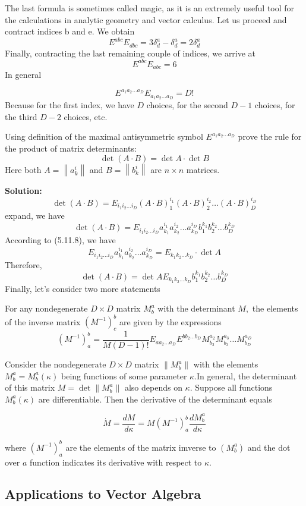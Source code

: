 The last formula is sometimes called magic, as it is an extremely useful tool for the calculations in analytic geometry and vector calculus. Let us proceed and contract indices b and e. We obtain
$$
E^{a b c} E_{d b c}=3 \delta_{d}^{a}-\delta_{d}^{a}=2 \delta_{d}^{a}
$$
Finally, contracting the last remaining couple of indices, we arrive at
$$
E^{a b c} E_{a b c}=6
$$
In general
\begin{qt}
\begin{equation}
E^{a_{1} a_{2} \ldots a_{D}} E_{a_{1} a_{2} \ldots a_{D}}=D !
\end{equation}
Because for the first index, we have $D$ choices, for the second $D-1$ choices, for the third $D-2$ choices, etc. 
\end{qt}
\begin{example}
Using definition of the maximal antisymmetric symbol $E^{a_{1} a_{2} \ldots a_{D}}$ prove the rule for the product of matrix determinants:
$$
\operatorname{det}(A \cdot B)=\operatorname{det} A \cdot \operatorname{det} B
$$
Here both $A=\left\|a_{k}^{i}\right\|$ and $B=\left\|b_{k}^{i}\right\|$ are $n \times n$ matrices.
\end{example}
\textbf{Solution:}
$$
\operatorname{det}(A \cdot B)=E_{i_{1} i_{2} \ldots i_{D}}(A \cdot B)_{1}^{i_{1}}(A \cdot B)_{2}^{i_{2}} \ldots(A \cdot B)_{D}^{i_{D}}
$$
expand, we have
$$
\operatorname{det}(A \cdot B)=E_{i_{1} i_{2} \ldots i_{D}} a_{k_{1}}^{i_{1}} a_{k_{2}}^{i_{2}} \ldots a_{k_{D}}^{i_{D}} b_{1}^{k_{1}} b_{2}^{k_{2}} \ldots b_{D}^{k_{D}}
$$
According to (5.11.8), we have
$$
E_{i_{1} i_{2} \ldots i_{D}} a_{k_{1}}^{i_{1}} a_{k_{2}}^{i_{2}} \ldots a_{k_{D}}^{i_{D}}=E_{k_{1} k_{2} \ldots k_{D}} \cdot \operatorname{det} A
$$
Therefore,
$$
\operatorname{det}(A \cdot B)=\operatorname{det} A E_{k_{1} k_{2} \ldots k_{D}} b_{1}^{k_{1}} b_{2}^{k_{2}} \ldots b_{D}^{k_{D}}
$$
Finally, let's consider two more statements
\begin{lemma}
For any nondegenerate $D \times D$ matrix $M_{b}^{a}$ with the determinant $M,$ the elements of the inverse matrix $\left(M^{-1}\right)_{c}^{b}$ are given by the expressions
\begin{equation}
\left(M^{-1}\right)_{a}^{b}=\frac{1}{M(D-1) !} E_{a a_{2} \ldots a_{D}} E^{b b_{2} \ldots b_{D}} M_{b_{2}}^{a_{2}} M_{b_{3}}^{a_{3}} \ldots M_{b_{D}}^{a_{D}}
\end{equation}
\end{lemma}
Consider the nondegenerate $D \times D$ matrix $\left\|M_{b}^{a}\right\|$ with the elements $M_{b}^{a}=M_{b}^{a}(\kappa)$ being functions of some parameter $\kappa .$In general, the determinant of this matrix $M=\operatorname{det}\left\|M_{b}^{a}\right\|$ also depends on $\kappa .$ Suppose all functions $M_{b}^{a}(\kappa)$ are differentiable. Then the derivative of the determinant equals
\begin{qt}
\begin{equation}
\dot{M}=\frac{d M}{d \kappa}=M\left(M^{-1}\right)_{a}^{b} \frac{d M_{b}^{a}}{d \kappa}
\end{equation}
\end{qt}
where $\left(M^{-1}\right)_{a}^{b}$ are the elements of the matrix imverse to $\left(M_{b}^{a}\right)$ and the dot over $a$ function indicates its derivative with respect to $\kappa$.

\subsection{Applications to Vector Algebra}
